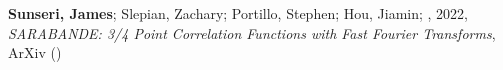 \item \textbf{Sunseri, James}; Slepian, Zachary; Portillo, Stephen; Hou, Jiamin; \etal, 2022, \emph{SARABANDE: 3/4 Point Correlation Functions with Fast Fourier Transforms}, ArXiv ()